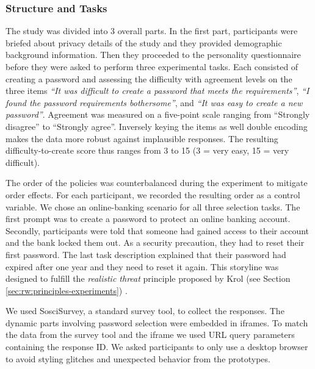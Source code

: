 \subsubsection{Structure and Tasks}
The study was divided into 3 overall parts. In the first part, participants were briefed about privacy details of the study and they provided demographic background information. Then they proceeded to the personality questionnaire before they were asked to perform three experimental tasks. Each consisted of creating a password and assessing the difficulty with agreement levels on the three items \textit{``It was difficult to create a password that meets the requirements''}, \textit{``I found the password requirements bothersome''}, and \textit{``It was easy to create a \textit{new} password''}. Agreement was measured on a five-point scale ranging from ``Strongly disagree'' to ``Strongly agree''. Inversely keying the items as well double encoding makes the data more robust against implausible responses. The resulting difficulty-to-create score thus ranges from 3 to 15 (3 = very easy, 15 = very difficult).

The order of the policies was counterbalanced during the experiment to mitigate order effects. For each participant, we recorded the resulting order as a control variable. We chose an online-banking scenario for all three selection tasks. The first prompt was to create a password to protect an online banking account. Secondly, participants were told that someone had gained access to their account and the bank locked them out. As a security precaution, they had to reset their first password. The last task description explained that their password had expired after one year and they need to reset it again. This storyline was designed to fulfill the \textit{realistic threat} principle proposed by Krol \etal (see Section \ref{sec:rw:principles-experiments}) \cite{Krol2016ExperimentDesign}. 

We used SosciSurvey, a standard survey tool, to collect the responses. The dynamic parts involving password selection were embedded in iframes. To match the data from the survey tool and the iframe we used URL query parameters containing the response ID. We asked participants to only use a desktop browser to avoid styling glitches and unexpected behavior from the prototypes. %

